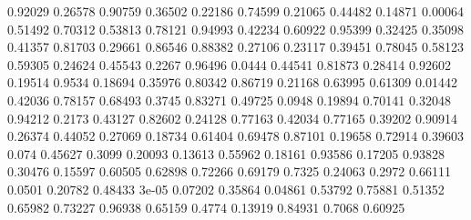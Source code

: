 \documentclass{article}
\newenvironment{eulernotebook}{\par}{\par}
\newenvironment{eulercomment}{\par\medskip}{\par\medskip}
\begin{document}
\begin{eulernotebook}
\begin{eulercomment}
\begin{eulercomment}
\begin{eulercomment}
\begin{eulercomment}
\begin{eulercomment}
\begin{eulercomment}
\begin{euleroutput}
              0.92029
              0.26578
              0.90759
              0.36502
              0.22186
              0.74599
              0.21065
              0.44482
              0.14871
              0.00064
              0.51492
              0.70312
              0.53813
              0.78121
              0.94993
              0.42234
              0.60922
              0.95399
              0.32425
              0.35098
              0.41357
              0.81703
              0.29661
              0.86546
              0.88382
              0.27106
              0.23117
              0.39451
              0.78045
              0.58123
              0.59305
              0.24624
              0.45543
               0.2267
              0.96496
               0.0444
              0.44541
              0.81873
              0.28414
              0.92602
              0.19514
               0.9534
              0.18694
              0.35976
              0.80342
              0.86719
              0.21168
              0.63995
              0.61309
              0.01442
              0.42036
              0.78157
              0.68493
               0.3745
              0.83271
              0.49725
               0.0948
              0.19894
              0.70141
              0.32048
              0.94212
               0.2173
              0.43127
              0.82602
              0.24128
              0.77163
              0.42034
              0.77165
              0.39202
              0.90914
              0.26374
              0.44052
              0.27069
              0.18734
              0.61404
              0.69478
              0.87101
              0.19658
              0.72914
              0.39603
                0.074
              0.45627
               0.3099
              0.20093
              0.13613
              0.55962
              0.18161
              0.93586
              0.17205
              0.93828
              0.30476
              0.15597
              0.60505
              0.62898
              0.72266
              0.69179
               0.7325
              0.24063
               0.2972
              0.66111
               0.0501
              0.20782
              0.48433
                3e-05
              0.07202
              0.35864
              0.04861
              0.53792
              0.75881
              0.51352
              0.65982
              0.73227
              0.96938
              0.65159
               0.4774
              0.13919
              0.84931
               0.7068
              0.60925

\end{euleroutput}
\end{eulercomment}
\end{eulercomment}
\end{eulercomment}
\end{eulercomment}
\end{eulercomment}
\end{eulercomment}
\end{eulernotebook}
\end{document}
